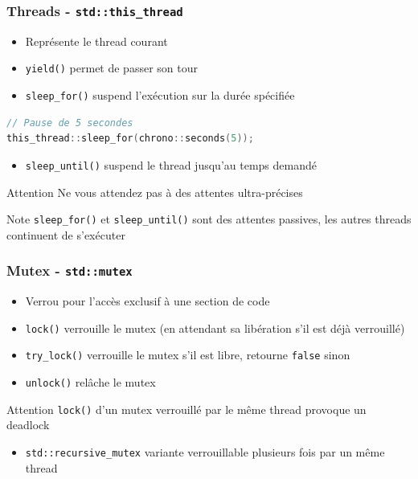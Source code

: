\documentclass[C++.tex]{subfiles}
\begin{document}
\begin{frame}[fragile]
	\frametitle{Threads - \lstinline|std::this_thread|}
	\begin{itemize}
		\item Représente le thread courant
		\item \lstinline|yield()| permet de \og passer son tour\fg{}


		\item \lstinline|sleep_for()| suspend l'exécution sur la durée spécifiée
	\end{itemize}

	\begin{lstlisting}[language=C++]
// Pause de 5 secondes
this_thread::sleep_for(chrono::seconds(5));\end{lstlisting}

	\begin{itemize}
		\item \lstinline|sleep_until()| suspend le thread jusqu'au temps demandé
	\end{itemize}

	\begin{alertblock}{Attention}
		Ne vous attendez pas à des attentes ultra-précises

	\end{alertblock}

	\begin{block}{Note}
		\lstinline|sleep_for()| et \lstinline|sleep_until()| sont des attentes passives, les autres threads continuent de s'exécuter
	\end{block}
\end{frame}

\begin{frame}[fragile]
	\frametitle{Mutex - \lstinline|std::mutex|}
	\begin{itemize}
		\item Verrou pour l'accès exclusif à une section de code
		\item \lstinline|lock()| verrouille le mutex (en attendant sa libération s'il est déjà verrouillé)
		\item \lstinline|try_lock()| verrouille le mutex s'il est libre, retourne \lstinline|false| sinon
		\item \lstinline|unlock()| relâche le mutex
	\end{itemize}

	\begin{alertblock}{Attention}
		\lstinline|lock()| d'un mutex verrouillé par le même thread provoque un deadlock
	\end{alertblock}

	\begin{itemize}
		\item \lstinline|std::recursive_mutex| variante verrouillable plusieurs fois par un même thread

	\end{itemize}
\end{frame}
\end{document}
